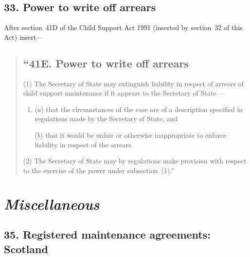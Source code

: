 \documentclass[12pt,a4paper]{article}
\begin{document}

\subsection{33. Power to write off arrears}

After section~41D of the Child Support Act 1991 (inserted by section~32 of this Act) insert---

\begin{quotation}
\subsection*{``41E. Power to write off arrears}

(1) The 
Secretary of State %
may extinguish liability in respect of arrears of child support maintenance if it appears to 
the Secretary of State%
---
\begin{enumerate}\item[]
($a$) that the circumstances of the case are of a description specified in regulations made by the Secretary of State, and

($b$) that it would be unfair or otherwise inappropriate to enforce liability in
respect of the arrears.
\end{enumerate}

(2)
The Secretary of State may by regulations make provision with respect to the exercise of the power under subsection~(1).''
\end{quotation}


\section{\itshape Miscellaneous}

\subsection{35. Registered maintenance agreements: Scotland}
\end{document}
